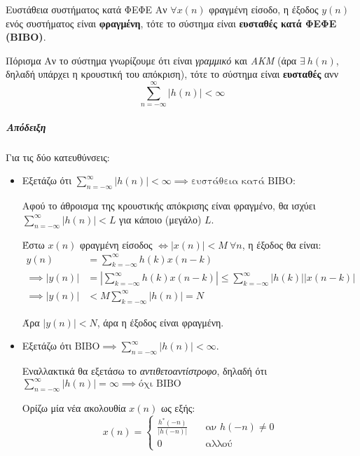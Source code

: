 \documentclass[11pt,a4paper,notitlepage,fleqn]{article}
\begin{document}
\begin{defn}{Ευστάθεια συστήματος κατά ΦΕΦΕ}{}
	Αν \( \forall x(n) \) φραγμένη είσοδο, η έξοδος \( y(n) \) ενός συστήματος 
	είναι \textbf{φραγμένη}, τότε το σύστημα είναι \textbf{ευσταθές κατά ΦΕΦΕ (BIBO)}.
\end{defn}

\begin{theorem}{Πόρισμα}{}
	Αν το σύστημα γνωρίζουμε ότι είναι \emph{γραμμικό} και \emph{ΑΚΜ} (άρα \( \exists\ h(n) \), δηλαδή υπάρχει η κρουστική του απόκριση), τότε το σύστημα είναι \textbf{ευσταθές} ανν
	\[
	\sum_{n=-\infty}^{\infty} \left|h(n)\right| < \infty
	\]
\end{theorem}
\subparagraph{Απόδειξη}
Για τις δύο κατευθύνσεις:
\begin{itemize}
	\item Εξετάζω ότι \( \sum_{n=-\infty}^{\infty} \left|h(n)\right| < \infty \implies \text{ευστάθεια κατά BIBO} \):
	
	Αφού το άθροισμα της κρουστικής απόκρισης είναι φραγμένο, θα ισχύει \( \displaystyle
	\sum_{n=-\infty}^{\infty} \left|h(n) \right| < L \) για κάποιο (μεγάλο) \( L \).
	
	Έστω \( x(n) \) φραγμένη είσοδος \( \iff \left|x(n)\right| < M \ \forall n \), η έξοδος θα είναι:
	\begin{align*}
		y(n) &= \sum_{k=-\infty}^{\infty} h(k)x(n-k)
		\\ \implies \left|y(n)\right| &= \left|\sum_{k=-\infty}^{\infty} h(k)x(n-k) \right|
		\leq \sum_{k=-\infty}^{\infty} \left|h(k)\right|\left|x(n-k)\right|
		\\ \implies \left|y(n)\right| &< M \sum_{k=-\infty}^{\infty} \left|h(n)\right|
		= N
	\end{align*}
	
	Άρα \( \left|y(n)\right| < N \), άρα η έξοδος είναι φραγμένη.
	
	\item Εξετάζω ότι \( \text{BIBO} \implies \sum_{n=-\infty}^{\infty} \left|h(n)\right| < \infty \).
	
	Εναλλακτικά θα εξετάσω το \textit{αντιθετοαντίστροφο}, δηλαδή ότι
	\( \displaystyle \sum_{n=-\infty}^{\infty} \left|h(n)\right| = \infty \implies
	\text{όχι BIBO} \)
	
	Ορίζω μία νέα ακολουθία \( x(n) \) ως εξής:
	\[
	x(n) = 
	\begin{cases}
	\frac{h^*(-n)}{\left| h(-n) \right|} 
 &\quad \text{αν } h(-n) \neq 0\\
	 0 &\quad \text{αλλού}
	 \end{cases}
	\]
	

\end{itemize}
\end{document}
